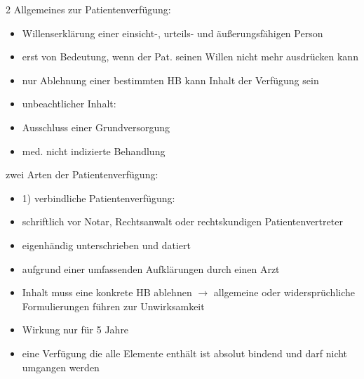 \documentclass{article}
\begin{document}
\begin{multicols}{2}
Allgemeines zur Patientenverf\"ugung:

\begin{itemize}
\item Willenserkl\"arung einer einsicht-, urteils- und
\"au{\ss}erungsf\"ahigen Person

\item erst von Bedeutung, wenn der Pat. seinen Willen nicht mehr
ausdr\"ucken kann

\item nur Ablehnung einer bestimmten HB kann Inhalt der Verf\"ugung sein

\item unbeachtlicher Inhalt:

\end{itemize}
\begin{itemize}
\item Ausschluss einer Grundversorgung

\item med. nicht indizierte Behandlung

\end{itemize}
zwei Arten der Patientenverf\"ugung:

\begin{itemize}
\item[] 1) verbindliche Patientenverf\"ugung:

\end{itemize}
\begin{itemize}
\item schriftlich vor Notar, Rechtsanwalt oder rechtskundigen
Patientenvertreter

\item eigenh\"andig unterschrieben und datiert

\item aufgrund einer umfassenden Aufkl\"arungen durch einen Arzt

\item Inhalt muss eine konkrete HB ablehnen ${\rightarrow}$ allgemeine
oder widerspr\"uchliche Formulierungen f\"uhren zur Unwirksamkeit

\item Wirkung nur f\"ur 5 Jahre

\end{itemize}
\begin{itemize}
\item[] eine Verf\"ugung die alle Elemente enth\"alt ist absolut bindend
und darf nicht umgangen werden


\end{itemize}
\end{multicols}
\end{document}
